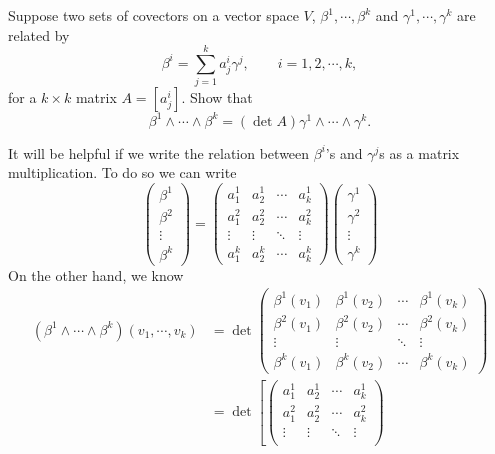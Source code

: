 \begin{problem}
	Suppose two sets of covectors on  a vector space $ V $, $ \beta^ 1,\cdots,\beta^k $ and $ \gamma^1,\cdots, \gamma^k $ are related by
	\[ \beta^i = \sum_{j=1}^{k} a_j^i \gamma ^j, \qquad i = 1,2,\cdots, k, \]
	for a $ k\times k $ matrix $ A = \left[a_j^i\right] $. Show that 
	\[ \beta^1 \wedge \cdots \wedge \beta^k = (\det A) \gamma^1 \wedge \cdots \wedge \gamma^k. \]
\end{problem}
\begin{solution}
	It will be helpful if we write the relation between $ \beta^i $'s and $ \gamma^j $s as a matrix multiplication. To do so we can write
	\[ 
	\begin{pmatrix}
		\beta^1 \\
		\beta^2 \\
		\vdots \\
		\beta^k
	\end{pmatrix} = 
	\begin{pmatrix}
		a^1_1 & a^1_2 & \cdots & a^1_k \\
		a^2_1 & a^2_2 & \cdots & a^2_k \\
		\vdots & \vdots & \ddots & \vdots \\
		a^k_1 & a^k_2 & \cdots & a^k_k
	\end{pmatrix}
	\begin{pmatrix}
		\gamma^1 \\
		\gamma^2 \\
		\vdots \\
		\gamma^k
	\end{pmatrix}
	 \]
	 On the other hand, we know
	 \begin{align*}
	 	(\beta^1\wedge\cdots \wedge \beta^k)(v_1,\cdots,v_k) 
	 	&= \det 
	 	\begin{pmatrix}
	 		\beta^1(v_1) & \beta^1(v_2) & \cdots & \beta^1(v_k) \\
	 		\beta^2(v_1) & \beta^2(v_2) & \cdots & \beta^2(v_k) \\
	 		\vdots & \vdots & \ddots & \vdots \\
	 		\beta^k(v_1) & \beta^k(v_2) & \cdots & \beta^k(v_k)
	 	\end{pmatrix}
	 	\\
	 	&= \det \left[
	 	\begin{pmatrix}
	 		a^1_1 & a^1_2 & \cdots & a^1_k \\
	 		a^2_1 & a^2_2 & \cdots & a^2_k \\
	 		\vdots & \vdots & \ddots & \vdots \\

\end{pmatrix}
\end{align*}
\end{solution}
